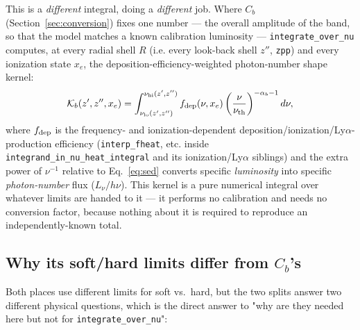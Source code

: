 \documentclass[11pt]{article}
\newcommand{\code}[1]{\texttt{#1}}
\begin{document}
This is a \emph{different} integral, doing a \emph{different} job. Where
$C_b$ (Section~\ref{sec:conversion}) fixes one number — the overall
amplitude of the band, so that the model matches a known calibration
luminosity — \code{integrate\_over\_nu} computes, at every radial shell
$R$ (i.e. every look-back shell $z''$, \code{zpp}) and every ionization
state $x_e$, the deposition-efficiency-weighted photon-number shape kernel:
\begin{equation}
  \mathcal{K}_b(z',z'',x_e) = \int_{\nu_{{\rm lo}}(z',z'')}^{\nu_{{\rm hi}}(z',z'')}
    f_{\rm dep}(\nu,x_e)\left(\frac{\nu}{\nu_{\rm th}}\right)^{-\alpha_b-1} d\nu,
  \label{eq:shape}
\end{equation}
where $f_{\rm dep}$ is the frequency- and ionization-dependent
deposition/ionization/Ly$\alpha$-production efficiency (\code{interp\_fheat},
etc. inside \code{integrand\_in\_nu\_heat\_integral} and its ionization/Ly$\alpha$
siblings) and the extra power of $\nu^{-1}$ relative to Eq.~\eqref{eq:sed}
converts specific \emph{luminosity} into specific \emph{photon-number} flux
($L_\nu/h\nu$). This kernel is a pure numerical integral over whatever
limits are handed to it — it performs no calibration and needs no
conversion factor, because nothing about it is required to reproduce an
independently-known total.

\subsection{Why its soft/hard limits differ from $C_b$'s}
\label{sec:why-limits}

Both places use different limits for soft vs.\ hard, but the two splits
answer two different physical questions, which is the direct answer to
"why are they needed here but not for \code{integrate\_over\_nu}":
\end{document}
